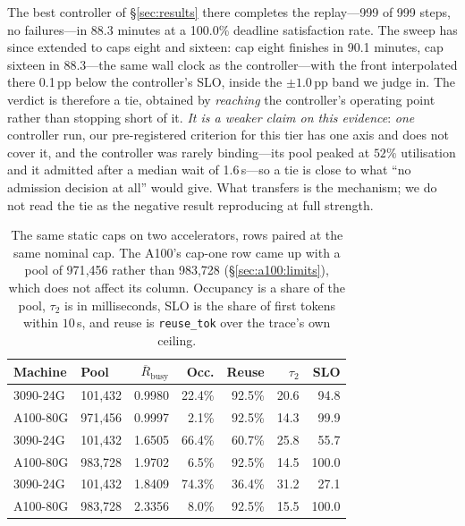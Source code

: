 The best controller of \S\ref{sec:results} there completes the replay---999 of 999
steps, no failures---in 88.3 minutes at a 100.0\% deadline satisfaction rate. The
sweep has since
extended to caps eight and sixteen: cap eight finishes in 90.1 minutes, cap sixteen
in 88.3---the same wall clock as the controller---with the front interpolated there
0.1\,pp below the controller's SLO, inside the $\pm1.0$\,pp band we judge in. The
verdict is therefore a tie, obtained by \emph{reaching} the controller's operating
point rather than stopping short of it. \emph{It is a weaker claim on this
evidence}: \emph{one}
controller run, our pre-registered criterion for this tier has one axis and does not
cover it, and the controller was rarely binding---its pool peaked at $52\%$
utilisation and it admitted after a median wait of 1.6\,s---so a tie is close to what
``no admission decision at all'' would give. What transfers is the mechanism; we do
not read the tie as the negative result reproducing at full strength.

\begin{table}[t]
  \centering
  \small
  \setlength{\tabcolsep}{4pt}%
  \begin{tabular}{llrrrrr}
    \toprule
    Machine & Pool & $\overline{R}_{\text{busy}}$ & Occ. & Reuse & $\tau_2$ & SLO \\
    \midrule
    3090-24G & 101{,}432  & 0.9980 & 22.4\% & 92.5\% & 20.6 & 94.8 \\
    A100-80G & 971{,}456  & 0.9997 &  2.1\% & 92.5\% & 14.3 & 99.9 \\
    \midrule
    3090-24G & 101{,}432  & 1.6505 & 66.4\% & 60.7\% & 25.8 & 55.7 \\
    A100-80G & 983{,}728  & 1.9702 &  6.5\% & 92.5\% & 14.5 & 100.0 \\
    \midrule
    3090-24G & 101{,}432  & 1.8409 & 74.3\% & 36.4\% & 31.2 & 27.1 \\
    A100-80G & 983{,}728  & 2.3356 &  8.0\% & 92.5\% & 15.5 & 100.0 \\
    \bottomrule
  \end{tabular}
  \caption{The same static caps on two accelerators, rows paired at the
  same nominal cap. The A100's cap-one row came up with a pool of 971{,}456
  rather than 983{,}728 (\S\ref{sec:a100:limits}), which does not affect its
  column. Occupancy is a share of the pool, $\tau_2$ is in milliseconds, SLO is
  the share of first tokens within $10$\,s, and reuse is \texttt{reuse\_tok} over
  the trace's own ceiling.}
  \label{tab:a100}
\end{table}

